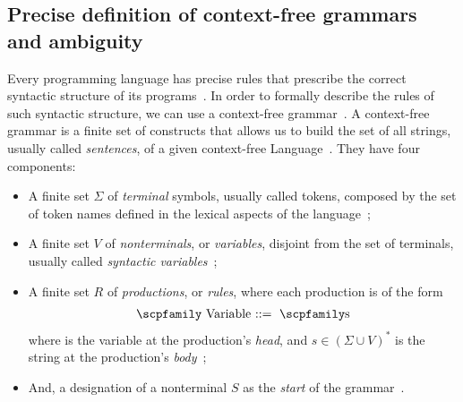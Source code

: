 \documentclass[
  oneside,
  english,
  coorientadorbanca,
  noabntexcite
]{ufsc-thesis-rn46-2019}
\def\bnfdef{::=}
\newcommand{\codett}[1]{\text{\scpfamily#1}}
\newcommand{\code}[1]{\text{\scpfamily\setlength\spaceskip{0.35em}#1}}
\newcommand{\bnfvar}[1]{\codett{#1}}
\newcommand{\bnfprod}[2]{\bnfvar{#1} & \ & \bnfdef{} & \ \code{#2}}
\begin{document}
\subsection{Precise definition of context-free grammars and ambiguity}
Every programming language has precise rules that prescribe the correct syntactic structure of its programs~\cite{Aho:2006:CPT:1177220}.
In order to formally describe the rules of such syntactic structure, we can use a context-free grammar~\cite{Aho:2006:CPT:1177220}.
A context-free grammar is a finite set of constructs that allows us to build the set of all strings, usually called \textit{sentences}, of a given context-free Language~\cite{sipser2012introduction}.
They have four components:
\begin{itemize}
  \item A finite set $\Sigma$ of \textit{terminal} symbols, usually called tokens, composed by the set of token names defined in the lexical aspects of the language~\cite{Aho:2006:CPT:1177220};
  \item A finite set $V$ of \textit{nonterminals}, or \textit{variables}, disjoint from the set of terminals, usually called \textit{syntactic variables}~\cite{Aho:2006:CPT:1177220};
  \item A finite set $R$ of \textit{productions}, or \textit{rules}, where each production is of the form
        \begin{equation*}
          \begin{alignedat}{2}
            \bnfprod{Variable}{s}
          \end{alignedat}
        \end{equation*}
        where \bnfvar{V} is the variable at the production's \textit{head}, and $s \in {(\Sigma \cup V)}^*$ is the string at the production's \textit{body}~\cite{sipser2012introduction};
  \item And, a designation of a nonterminal $S$ as the \textit{start} of the grammar~\cite{Aho:2006:CPT:1177220}.
\end{itemize}
\end{document}
